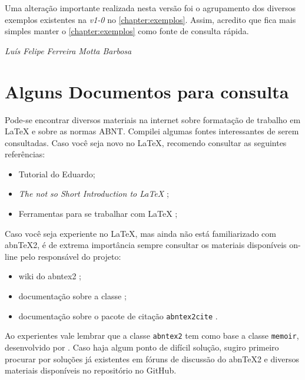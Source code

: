 \documentclass[
  12pt,		%
  a4paper,	%
  openright,%
  oneside,	%
  chapter=TITLE,		%
  section=TITLE,		%
  english,	%
  french,	%
  spanish,	%
  brazil
]{abntex2}
\begin{document}
    Uma alteração importante realizada nesta versão foi o agrupamento dos diversos exemplos existentes na \emph{v1-0} no \autoref{chapter:exemplos}.  Assim, acredito que fica mais simples manter o  \autoref{chapter:exemplos} como fonte de consulta rápida.
    
    
    
    \begin{flushright}
    \textit{Luís Felipe Ferreira Motta Barbosa}
    \end{flushright}
    
    
    
    
    \section{Alguns Documentos para consulta}
    
    Pode-se encontrar diversos materiais na internet sobre formatação de trabalho em \LaTeX{} e sobre as normas ABNT. Compilei algumas fontes interessantes de serem consultadas.    Caso você seja novo no \LaTeX{}, recomendo consultar as seguintes referências:
    
    \begin{itemize}
        \item Tutorial do Eduardo;
        \item \textit{The not so Short Introduction to LaTeX} \cite{lshort};
        \item Ferramentas para se trabalhar com \LaTeX{} \cite{abntex2-wiki-ferramentas};%

    \end{itemize}
    
    Caso você seja experiente no \LaTeX{}, mas ainda não está familiarizado com abn\TeX{}2, é de extrema importância sempre consultar os materiais disponíveis on-line pelo responsável do projeto:
    \begin{itemize}
        \item wiki do abntex2 \cite{abntex2-wiki};
        \item documentação sobre a classe ;
        \item documentação sobre o pacote de citação \verb|abntex2cite| .
    \end{itemize}
    
    Ao experientes vale lembrar que a classe  \verb|abntex2| tem como base a classe  \verb|memoir|, desenvolvido por . Caso haja algum ponto de difícil solução, sugiro primeiro procurar por soluções já existentes em fóruns de discussão do abn\TeX2{} e diversos materiais disponíveis no repositório no GitHub.
    
\end{document}
